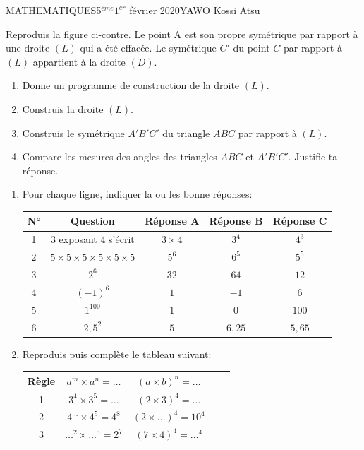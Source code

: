 \documentclass[12pt,a4paper]{book}
\newcommand{\prof}{YAWO Kossi Atsu}
\newcommand{\matiere}{MATHEMATIQUES}
\newcommand{\classe}{5$^{ème}$}
\begin{document}
\newpage
\begin{td}{\matiere}{\classe}{$1^{er}$ février 2020}{\prof}
\begin{exo}
Reproduis la figure ci-contre. Le point A est son propre symétrique par rapport à une droite $(L)$ qui a été effacée. Le symétrique $C'$ du point $C$ par rapport à $(L)$ appartient à la droite  $(D)$.
\begin{enumerate}
\item Donne un programme de construction de la droite $(L)$. 
\item Construis la droite $(L)$.
\item Construis le symétrique $A'B'C'$ du triangle $ABC$ par rapport à $(L)$.
\item Compare les mesures des angles des triangles $ABC$ et $A'B'C'$. Justifie ta réponse.
\end{enumerate}
\end{exo}

\vspace{1cm}
\begin{exo}
\begin{enumerate}
\item Pour chaque ligne, indiquer la ou les bonne réponses:\\
\begin{tabular}{|c|c|c|c|c|}
\hline 
N° & Question & Réponse A & Réponse B & Réponse C \\ 
\hline 
1 & 3 exposant 4 s'écrit & $3 \times 4$ & $3^4$& $4^3$\\ 
\hline 
2 & $5\times5\times5\times5\times5\times5$ & $5^6$ & $6^5$ &$5^5$\\ 
\hline 
3 & $2^6$ & $32$ & $64$ &$12$ \\ 
\hline
4 & $(-1)^6$ & $1$ & $-1$ &$6$ \\ 
\hline
5 & $1^100$ & $1$ & $0$ &$100$ \\ 
\hline
6 & $2,5^2$ & $5$ & $6,25$ &$5,65$ \\ 
\hline
\end{tabular} 

\item Reproduis puis complète le tableau suivant:\\
\begin{tabular}{|c|c|c|c|c|}
\hline 
Règle & $a^m\times a^n=\ldots$ & $(a\times b)^n=\ldots$\\ 
\hline 
1 & $3^4 \times 3^5=\ldots$ & $(2\times 3)^4=\ldots$\\ 
\hline 
2 & $4^{\ldots} \times 4^5=4^8$ & $(2\times \ldots)^4=10^4$\\ 
\hline 
3 & $\ldots^2 \times \ldots^5=2^7$ & $(7\times 4)^4=\ldots^4$\\ 
\hline 
\end{tabular} 


\end{enumerate}
\end{exo}
\end{td}
\end{document}
